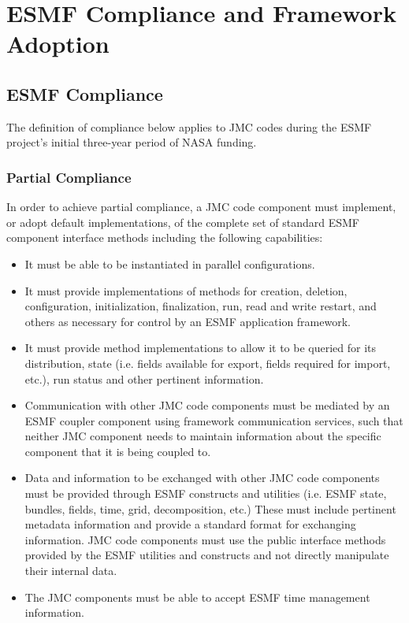 \section{ESMF Compliance and Framework Adoption}
\label{sec:implications}

\subsection{ESMF Compliance}

The definition of compliance below applies to JMC codes during the
ESMF project's initial three-year period of NASA funding.

\subsubsection{Partial Compliance}
In order to achieve partial compliance, a JMC code component must 
implement, or adopt default implementations, of the complete set of 
standard ESMF component interface methods including the following
capabilities:

\begin{itemize}
\item It must be able to be instantiated in parallel configurations.

\item It must provide implementations of methods for creation, deletion, 
configuration, initialization, finalization, run, read and write 
restart, and others as necessary for control by an ESMF application 
framework.

\item It must provide method implementations to allow it to be queried 
for its distribution, state (i.e. fields available for export, fields 
required for import, etc.), run status and other pertinent 
information.

\item Communication with other JMC code components must be mediated by an 
ESMF coupler component using framework communication services, such 
that neither JMC component needs to maintain information about the 
specific component that it is being coupled to. 

\item Data and information to be exchanged with other JMC code components
must be provided through ESMF constructs and utilities (i.e. ESMF state,
bundles, fields, time, grid, decomposition, etc.) These must include
pertinent metadata information and provide a standard format for
exchanging information. JMC code components must use the public
interface methods provided by the ESMF utilities and constructs and not
directly manipulate their internal data.

\item The JMC components must be able to accept ESMF time management 
information.
\end{itemize}

